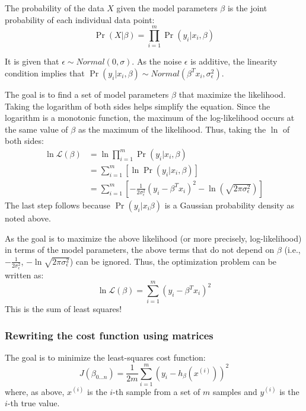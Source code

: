 \documentclass{article}
\begin{document}
	The probability of the data $X$ given the model parameters $\beta$ is the joint probability of each individual data point:
	\begin{equation*}
	\Pr(X|\beta)=\prod_{i=1}^{m}\Pr(y_i|x_i,\beta)
	\end{equation*}
	
	It is given that $\epsilon\sim Normal(0,\sigma)$. As the noise $\epsilon$ is additive, the linearity condition implies that $\Pr(y_i|x_i,\beta)\sim Normal(\beta^{T}x_i,\sigma_\epsilon^2)$.
	
	The goal is to find a set of model parameters $\beta$ that maximize the likelihood. Taking the logarithm of both sides helps simplify the equation. Since the logarithm is a monotonic function, the maximum of the log-likelihood occurs at the same value of $\beta$ as the maximum of the likelihood. Thus, taking the $\ln$ of both sides:
	\begin{align*}
	\ln\mathcal{L}(\beta)&= \ln \prod_{i=1}^{m}\Pr(y_i|x_i,\beta)\\
	&=\sum_{i=1}^{m}\left[\ln \Pr(y_i|x_i,\beta)\right]\\
	&=\sum_{i=1}^{m}\left[-\frac{1}{2\sigma_\epsilon^2}(y_i-\beta^Tx_i)^2-\ln \left(\sqrt{2\pi\sigma_\epsilon^2}\right)\right]
	\end{align*}
	The last step follows because $\Pr(y_i|x_i\beta)$ is a Gaussian probability density as noted above.
	
	As the goal is to maximize the above likelihood (or more precisely, log-likelihood) in terms of the model parameters, the above terms that do not depend on $\beta$ (i.e., $-\frac{1}{2\sigma_\epsilon^2}$, $-\ln \sqrt{2\pi\sigma_\epsilon^2}$) can be ignored. Thus, the optimization problem can be written as:
	\begin{equation*}
	\ln\mathcal{L}(\beta)=\sum_{i=1}^{m}(y_i-\beta^Tx_i)^2
	\end{equation*}
	This is the sum of least squares!
	
	\subsubsection{Rewriting the cost function using matrices}
	The goal is to minimize the least-squares cost function:
	\begin{equation*}
	J(\beta_{0...n})= \frac{1}{2m}\sum_{i=1}^{m}(y_i - h_\beta(x^{(i)}))^2
	\end{equation*}
	where, as above, $x^{(i)}$ is the $i$-th sample from a set of $m$ samples and $y^{(i)}$ is the $i$-th true value.
	
\end{document}
